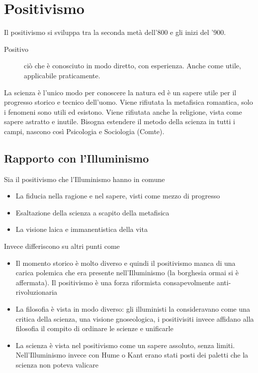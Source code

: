 
\section{Positivismo}
Il positivismo si sviluppa tra la seconda metà dell'800 e gli inizi del '900.
\begin{description}
  \item[Positivo] ciò che è conosciuto in modo diretto, con esperienza. Anche come utile, applicabile
    praticamente.
\end{description}
La scienza è l'unico modo per conoscere la natura ed è un sapere utile per il progresso storico e
tecnico dell'uomo. Viene rifiutata la metafisica romantica, solo i fenomeni sono utili ed esistono.
Viene rifiutata anche la religione, vista come sapere astratto e inutile. Bisogna estendere il
metodo della scienza in tutti i campi, nascono così Psicologia e Sociologia (Comte).

\subsection{Rapporto con l'Illuminismo}
Sia il positivismo che l'Illuminismo hanno in comune
\begin{itemize}
  \item La fiducia nella ragione e nel sapere, visti come mezzo di progresso
  \item Esaltazione della scienza a scapito della metafisica
  \item La visione laica e immanentistica della vita
\end{itemize}
Invece differiscono su altri punti come
\begin{itemize}
  \item Il momento storico è molto diverso e quindi il positivismo manca di una carica polemica
    che era presente nell'Illuminismo (la borghesia ormai si è affermata). Il positivismo è una
    forza riformista consapevolmente anti-rivoluzionaria
  \item La filosofia è vista in modo diverso: gli illuministi la consideravano come una critica
    della scienza, una visione gnoseologica, i positivisiti invece affidano alla filosofia il compito
    di ordinare le scienze e unificarle
  \item La scienza è vista nel positivismo come un sapere assoluto, senza limiti. Nell'Illuminismo
    invece con Hume o Kant erano stati posti dei paletti che la scienza non poteva valicare
\end{itemize}

